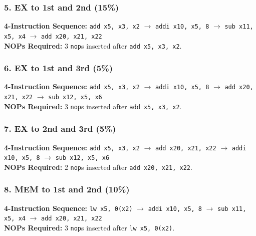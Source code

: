 \documentclass[11pt, a4paper]{article}
\begin{document}

\subsubsection*{5. EX to 1st and 2nd (15\%)}
\textbf{4-Instruction Sequence:} \texttt{add x5, x3, x2} $\rightarrow$ \texttt{addi x10, x5, 8} $\rightarrow$ \texttt{sub x11, x5, x4} $\rightarrow$ \texttt{add x20, x21, x22} \\
\textbf{NOPs Required:} 3 \texttt{nop}s inserted after \texttt{add x5, x3, x2}.


\subsubsection*{6. EX to 1st and 3rd (5\%)}
\textbf{4-Instruction Sequence:} \texttt{add x5, x3, x2} $\rightarrow$ \texttt{addi x10, x5, 8} $\rightarrow$ \texttt{add x20, x21, x22} $\rightarrow$ \texttt{sub x12, x5, x6} \\
\textbf{NOPs Required:} 3 \texttt{nop}s inserted after \texttt{add x5, x3, x2}.


\subsubsection*{7. EX to 2nd and 3rd (5\%)}
\textbf{4-Instruction Sequence:} \texttt{add x5, x3, x2} $\rightarrow$ \texttt{add x20, x21, x22} $\rightarrow$ \texttt{addi x10, x5, 8} $\rightarrow$ \texttt{sub x12, x5, x6} \\
\textbf{NOPs Required:} 2 \texttt{nop}s inserted after \texttt{add x20, x21, x22}.


\subsubsection*{8. MEM to 1st and 2nd (10\%)}
\textbf{4-Instruction Sequence:} \texttt{lw x5, 0(x2)} $\rightarrow$ \texttt{addi x10, x5, 8} $\rightarrow$ \texttt{sub x11, x5, x4} $\rightarrow$ \texttt{add x20, x21, x22} \\
\textbf{NOPs Required:} 3 \texttt{nop}s inserted after \texttt{lw x5, 0(x2)}.


\end{document}
